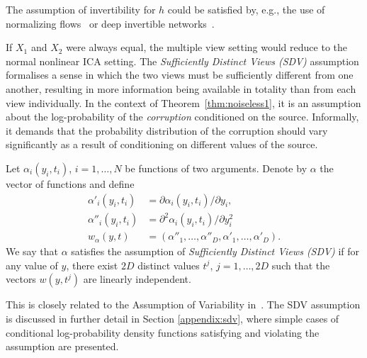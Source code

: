 The assumption of invertibility for $h$ could be satisfied by, e.g., the use of normalizing flows~\citep{rezende2015variational, chen2018neural} or deep invertible networks~\citep{jacobsen_hal-01712808}.


If $X_1$ and $X_2$ were always equal, the multiple view setting would reduce to the normal nonlinear ICA setting.
The \emph{Sufficiently Distinct Views (SDV)} assumption formalises a sense in which the two views must be sufficiently different from one another,
resulting in more information being available in totality than from each view individually.
In the context of Theorem~\ref{thm:noiseless1}, it is an assumption about the log-probability of the \emph{corruption} conditioned on the source.
Informally, it demands that the probability distribution of the corruption should vary significantly as a result of conditioning on different values of the source.

\medskip

\begin{definition}\label{suff_dist_assumption}
	Let $\alpha_i(y_i, t_i)$, $i=1,\ldots, N$ be functions of two arguments.
	Denote by $\alpha$ the vector of functions and define
	\begin{align}
	\alpha'_{i}(y_i, t_i)&= \partial \alpha_{i}(y_i, t_i)/\partial y_i, \label{eq:convention1}\\
	\alpha''_{i}(y_i, t_i)&=\partial^2 \alpha_{i}(y_i, t_i)/\partial y_i^2\, \label{eq:convention2}\\
	{w}_{\alpha}({y}, {t}) &= (\alpha''_{1}, \ldots, \alpha''_{D}, \alpha'_{1}, \ldots,\alpha'_{D}).
	\end{align}
	We say that ${\alpha}$ satisfies the assumption of \emph{Sufficiently Distinct Views (SDV)} if for any value of ${y}$, there exist $2D$ distinct values ${t}^j$, $j=1, \ldots, 2D$ such that the vectors ${w}({y},{t}^j)$ are linearly independent.
	\\    \end{definition}
This is closely related to the Assumption of Variability in~\cite{hyvarinen19a}.
The SDV assumption is discussed in further detail in Section \ref{appendix:sdv}, where simple cases of conditional log-probability density functions satisfying and violating the assumption are presented.



